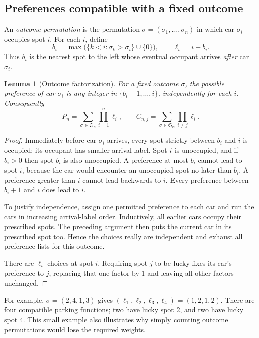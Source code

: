 \documentclass[11pt,letterpaper]{article}
\numberwithin{equation}{section}
\newtheorem{lemma}[theorem]{Lemma}
\theoremstyle{definition}
\begin{document}
\subsection{Preferences compatible with a fixed outcome}
An \emph{outcome permutation} is the permutation
$\sigma=(\sigma_1,\ldots,\sigma_n)$ in which car $\sigma_i$ occupies spot $i$.
For each $i$, define
\begin{equation}\label{eq:lengths}
 b_i=\max\bigl(\{k<i:\sigma_k>\sigma_i\}\cup\{0\}\bigr),
 \qquad \ell_i=i-b_i.
\end{equation}
Thus $b_i$ is the nearest spot to the left whose eventual occupant arrives
\emph{after} car $\sigma_i$.

\begin{lemma}[Outcome factorization]\label{lem:outcome}
For a fixed outcome $\sigma$, the possible preference of car $\sigma_i$ is
any integer in $\{b_i+1,\ldots,i\}$, independently for each $i$. Consequently
\begin{equation}\label{eq:weights}
 P_n=\sum_{\sigma\in\mathfrak S_n}\prod_{i=1}^n\ell_i,
 \qquad
 C_{n,j}=\sum_{\sigma\in\mathfrak S_n}\prod_{i\ne j}\ell_i.
\end{equation}
\end{lemma}
\begin{proof}
Immediately before car $\sigma_i$ arrives, every spot strictly between
$b_i$ and $i$ is occupied: its occupant has smaller arrival label. Spot $i$
is unoccupied, and if $b_i>0$ then spot $b_i$ is also unoccupied. A preference
at most $b_i$ cannot lead to spot $i$, because the car would encounter an
unoccupied spot no later than $b_i$. A preference greater than $i$ cannot
lead backwards to $i$. Every preference between $b_i+1$ and $i$ does lead to
$i$.

To justify independence, assign one permitted preference to each car and
run the cars in increasing arrival-label order. Inductively, all earlier
cars occupy their prescribed spots. The preceding argument then puts the
current car in its prescribed spot too. Hence the choices really are
independent and exhaust all preference lists for this outcome.

There are $\ell_i$ choices at spot $i$. Requiring spot $j$ to be lucky fixes
its car's preference to $j$, replacing that one factor by $1$ and leaving
all other factors unchanged.
\end{proof}

For example, $\sigma=(2,4,1,3)$ gives
$(\ell_1,\ell_2,\ell_3,\ell_4)=(1,2,1,2)$. There are four compatible parking
functions; two have lucky spot 2, and two have lucky spot 4. This small
example also illustrates why simply counting outcome permutations would
lose the required weights.
\end{document}
